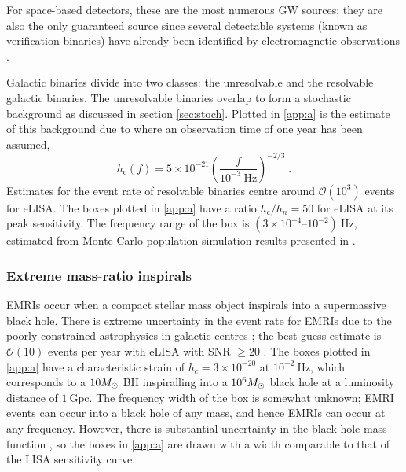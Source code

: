 For space-based detectors, these are the most numerous GW sources; they are also the only guaranteed source since several detectable systems (known as verification binaries) have already been identified by electromagnetic observations \citep{2006CQGra..23S.809S}.

Galactic binaries divide into two classes: the unresolvable and the resolvable galactic binaries. The unresolvable binaries overlap to form a stochastic background as discussed in section \ref{sec:stoch}.  Plotted in \ref{app:a} is the estimate of this background due to \citet{Nelemans} where an observation time of one year has been assumed,
\begin{equation}
h_\mathrm{c}(f)= 5\times 10^{-21} \left(\frac{f}{10^{-3}~\mathrm{Hz}}\right)^{-2/3} \; .
 \end{equation}
Estimates for the event rate of resolvable binaries centre around ${\mathcal{O}}(10^{3})$ events for eLISA. The boxes plotted in \ref{app:a} have a ratio $h_\mathrm{c}/h_{n}=50$ for eLISA at its peak sensitivity. The frequency range of the box is $\left(3\times10^{-4}\right.$--$\left.10^{-2}\right)~\mathrm{Hz}$, estimated from Monte Carlo population simulation results presented in \citet{Amaro-Seoane-et-al}.

\subsubsection{Extreme mass-ratio inspirals}

EMRIs occur when a compact stellar mass object inspirals into a supermassive black hole. There is extreme uncertainty in the event rate for EMRIs due to the poorly constrained astrophysics in galactic centres \citep[e.g.,][]{Merritt2011}; the best guess estimate is ${\mathcal{O}}(10)$ events per year with eLISA with SNR $\ge 20$ . The boxes plotted in \ref{app:a} have a characteristic strain of $h_{c}=3\times 10^{-20}$ at $10^{-2}~\mathrm{Hz}$, which corresponds to a $10M_{ \odot }$ BH inspiralling into a $10^{6}M_{ \odot }$ black hole at a luminosity distance of $1~\mathrm{Gpc}$. The frequency width of the box is somewhat unknown; EMRI events can occur into a black hole of any mass, and hence EMRIs can occur at any frequency. However, there is substantial uncertainty in the black hole mass function , so the boxes in \ref{app:a} are drawn with a width comparable to that of the LISA sensitivity curve.




